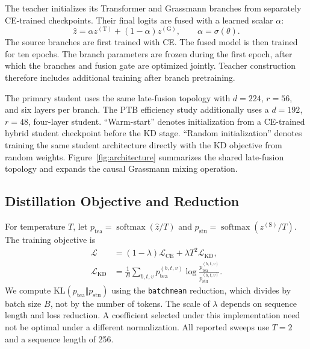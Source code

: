 \documentclass[conference]{IEEEtran}
\begin{document}
The teacher initializes its Transformer and Grassmann branches from separately
CE-trained checkpoints.  Their final logits are fused with a learned scalar
$\alpha$:
\begin{equation}
\widehat{z}=\alpha z^{(\mathrm{T})}+(1-\alpha)z^{(\mathrm{G})},
\qquad \alpha=\sigma(\theta).
\label{eq:teacher_fusion}
\end{equation}
The source branches are first trained with CE.  The fused model is then
trained for ten epochs.  The branch parameters are frozen during the first
epoch, after which the branches and fusion gate are optimized jointly.
Teacher construction therefore includes additional training after branch
pretraining.

The primary student uses the same late-fusion topology with $d=224$, $r=56$, and
six layers per branch.  The PTB efficiency study additionally uses a
$d=192$, $r=48$, four-layer student.  ``Warm-start'' denotes initialization
from a CE-trained hybrid student checkpoint before the KD stage.
``Random initialization'' denotes training the same student architecture
directly with the KD objective from random weights.
Figure~\ref{fig:architecture} summarizes the shared late-fusion topology and
expands the causal Grassmann mixing operation.

\subsection{Distillation Objective and Reduction}

For temperature $T$, let
$p_{\mathrm{tea}}=\operatorname{softmax}(\widehat{z}/T)$ and
$p_{\mathrm{stu}}=\operatorname{softmax}(z^{(\mathrm{S})}/T)$.  The training
objective is
\begin{align}
\mathcal{L} &=(1-\lambda)\mathcal{L}_{\mathrm{CE}}
+\lambda T^2\mathcal{L}_{\mathrm{KD}}, \\
\mathcal{L}_{\mathrm{KD}}&=\frac{1}{B}
\sum_{b,t,v}p_{\mathrm{tea}}^{(b,t,v)}
\log\frac{p_{\mathrm{tea}}^{(b,t,v)}}{p_{\mathrm{stu}}^{(b,t,v)}}.
\label{eq:kd}
\end{align}
We compute $\mathrm{KL}(p_{\mathrm{tea}}\Vert p_{\mathrm{stu}})$ using the
\texttt{batchmean} reduction, which divides by batch size $B$, not by the number of
tokens.  The scale of $\lambda$ depends on sequence length and
loss reduction.  A coefficient selected under this implementation need not
be optimal under a different normalization.  All reported sweeps use $T=2$
and a sequence length of 256.
\end{document}
